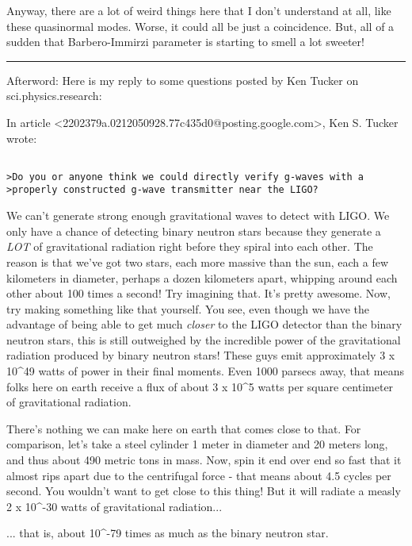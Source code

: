 Anyway, there are a lot of weird things here that I don't understand at
all, like these quasinormal modes.  Worse, it could all be just a
coincidence.  But, all of a sudden that Barbero-Immirzi parameter
is starting to smell a lot sweeter!

\par\noindent\rule{\textwidth}{0.4pt}


Afterword: Here is my reply to some questions posted by Ken Tucker on
sci.physics.research:

In article <2202379a.0212050928.77c435d0@posting.google.com>,
Ken S. Tucker wrote:


\begin{verbatim}

>Do you or anyone think we could directly verify g-waves with a
>properly constructed g-wave transmitter near the LIGO?
\end{verbatim}
    

We can't generate strong enough gravitational waves to detect 
with LIGO.  We only have a chance of detecting binary neutron 
stars because they generate a \emph{LOT} of gravitational radiation
right before they spiral into each other.  The reason is that 
we've got two stars, each more massive than the sun, each a 
few kilometers in diameter, perhaps a dozen kilometers apart,
whipping around each other about 100 times a second!  
Try imagining that.  It's pretty awesome.
Now, try making something like that yourself.  
You see, even though we have the advantage of being able to get 
much \emph{closer} to the LIGO detector than the binary neutron stars,
this is still outweighed by the incredible power of the 
gravitational radiation produced by binary neutron stars!
These guys emit approximately 3 x 10^{49} watts of power in
their final moments.  Even 1000 parsecs away, that means 
folks here on earth receive a flux of about 3 x 10^{5} watts 
per square centimeter of gravitational radiation.  

There's nothing we can make here on earth that comes close to 
that.  For comparison, let's take a steel cylinder 1 meter 
in diameter and 20 meters long, and thus about 490 metric
tons in mass.  Now, spin it end over end so fast that it 
almost rips apart due to the centrifugal force - that means 
about 4.5 cycles per second.  You wouldn't want to get close to 
this thing!  But it will radiate a measly 2 x 10^{-30} watts of 
gravitational radiation... 

... that is, about 10^{-79} times as much as the binary neutron star.  

